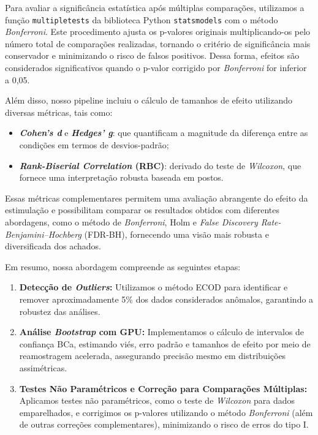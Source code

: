 Para avaliar a significância estatística após múltiplas comparações, utilizamos a função \texttt{multipletests} da biblioteca Python \texttt{statsmodels} com o método \textit{Bonferroni}. Este procedimento ajusta os p-valores originais multiplicando-os pelo número total de comparações realizadas, tornando o critério de significância mais conservador e minimizando o risco de falsos positivos. Dessa forma, efeitos são considerados significativos quando o p-valor corrigido por \textit{Bonferroni} for inferior a 0,05.

Além disso, nosso pipeline incluiu o cálculo de tamanhos de efeito utilizando diversas métricas, tais como:
\begin{itemize}
    \item \textbf{\textit{Cohen's d}} e \textbf{\textit{Hedges' g}}: que quantificam a magnitude da diferença entre as condições em termos de desvios-padrão;
    \item \textbf{\textit{Rank-Biserial Correlation} (RBC)}: derivado do teste de \textit{Wilcoxon}, que fornece uma interpretação robusta baseada em postos.
\end{itemize}

Essas métricas complementares permitem uma avaliação abrangente do efeito da estimulação e possibilitam comparar os resultados obtidos com diferentes abordagens, como o método de \textit{Bonferroni}, Holm e \textit{False Discovery Rate-Benjamini–Hochberg} (FDR-BH), fornecendo uma visão mais robusta e diversificada dos achados.

Em resumo, nossa abordagem compreende as seguintes etapas:
\begin{enumerate}
    \item \textbf{Detecção de \textit{Outliers}:} Utilizamos o método ECOD para identificar e remover aproximadamente 5\% dos dados considerados anômalos, garantindo a robustez das análises.
    \item \textbf{Análise \textit{Bootstrap} com GPU:} Implementamos o cálculo de intervalos de confiança BCa, estimando viés, erro padrão e tamanhos de efeito por meio de reamostragem acelerada, assegurando precisão mesmo em distribuições assimétricas.
    \item \textbf{Testes Não Paramétricos e Correção para Comparações Múltiplas:} Aplicamos testes não paramétricos, como o teste de \textit{Wilcoxon} para dados emparelhados, e corrigimos os p-valores utilizando o método \textit{Bonferroni} (além de outras correções complementares), minimizando o risco de erros do tipo I.
\end{enumerate}

